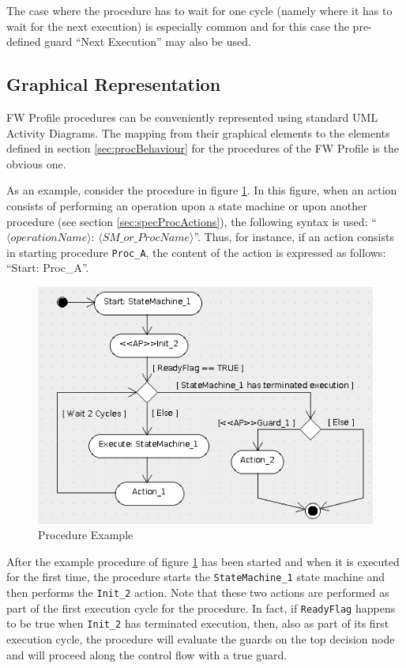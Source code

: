 \documentclass[a4paper,10pt]{article}
\begin{document}
The case where the procedure has to wait for one cycle (namely where it has to wait for the
next execution) is especially common and for this case the pre-defined guard “Next Execution” may also
be used.

\subsection{Graphical Representation}\label{sec:procGraphRep} 
FW Profile procedures can be conveniently represented using standard UML Activity Diagrams. The mapping from their graphical elements to the elements defined in section \ref{sec:procBehaviour} for the procedures of the FW Profile is the obvious one.

As an example, consider the procedure in figure \ref{fig:PR_Example}. In this figure, when an action consists of performing an operation upon a state machine or upon another procedure (see section \ref{sec:specProcActions}), the following syntax is used: “$\langle operationName \rangle$: $\langle SM\_or\_ProcName \rangle$”. Thus, for instance, if an action consists in starting procedure \texttt{Proc\_A}, the content of the action is expressed as follows: “Start: Proc\_A”.

\begin{figure}[ht]
 \centering
 \includegraphics[scale=0.5,keepaspectratio=true]{../images/PR_Example.png}
 \caption{Procedure Example}
 \label{fig:PR_Example}
\end{figure}

After the example procedure of figure \ref{fig:PR_Example} has been started and when it is executed for the first time, the procedure starts the \texttt{StateMachine\_1} state machine and then performs the \texttt{Init\_2} action. Note that these two actions are performed as part of the first execution cycle for the procedure. In fact, if \texttt{ReadyFlag} happens to be true when \texttt{Init\_2} has terminated execution, then, also as part of its first execution cycle, the procedure will evaluate the guards on the top decision node and will proceed along the control flow with a true guard.
\end{document}
